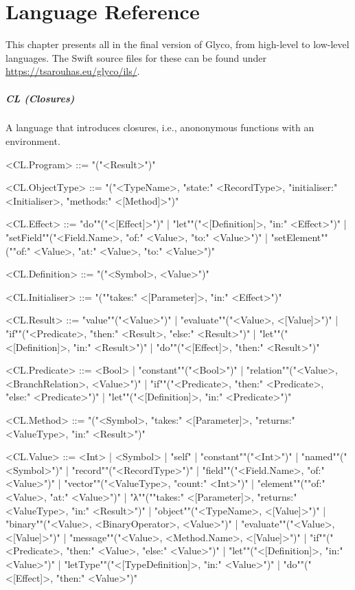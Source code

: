 \documentclass[main.tex]{subfiles}
\begin{document}
\onlyinsubfile{\mainmatter{}\appendix{}}

\chapter{Language Reference}
\label{ch:grammar}
This chapter presents all  in the final version of Glyco, from high-level to low-level languages. The Swift source files for these  can be found under \url{https://tsarouhas.eu/glyco/ils/}.

\paragraph{ CL (Closures) } A language that introduces closures, i.e., anononymous functions with an environment.
\begin{grammar}
	\footnotesize
				<CL.Program> ::=
							"("<Result>")"
				\par
				<CL.ObjectType> ::=
							"("<TypeName>, "state:" <RecordType>, "initialiser:" <Initialiser>, "methods:" <[Method]>")"
				\par
				<CL.Effect> ::=
						"do""("<[Effect]>")"
						| "let""("<[Definition]>, "in:" <Effect>")"
						| "setField""("<Field.Name>, "of:" <Value>, "to:" <Value>")"
						| "setElement""(""of:" <Value>, "at:" <Value>, "to:" <Value>")"
				\par
				<CL.Definition> ::=
							"("<Symbol>, <Value>")"
				\par
				<CL.Initialiser> ::=
							"(""takes:" <[Parameter]>, "in:" <Effect>")"
				\par
				<CL.Result> ::=
						"value""("<Value>")"
						| "evaluate""("<Value>, <[Value]>")"
						| "if""("<Predicate>, "then:" <Result>, "else:" <Result>")"
						| "let""("<[Definition]>, "in:" <Result>")"
						| "do""("<[Effect]>, "then:" <Result>")"
				\par
				<CL.Predicate> ::=
						<Bool> |
						"constant""("<Bool>")"
						| "relation""("<Value>, <BranchRelation>, <Value>")"
						| "if""("<Predicate>, "then:" <Predicate>, "else:" <Predicate>")"
						| "let""("<[Definition]>, "in:" <Predicate>")"
				\par
				<CL.Method> ::=
							"("<Symbol>, "takes:" <[Parameter]>, "returns:" <ValueType>, "in:" <Result>")"
				\par
				<CL.Value> ::=
						<Int> |
								<Symbol> |
						"self"
						| "constant""("<Int>")"
						| "named""("<Symbol>")"
						| "record""("<RecordType>")"
						| "field""("<Field.Name>, "of:" <Value>")"
						| "vector""("<ValueType>, "count:" <Int>")"
						| "element""(""of:" <Value>, "at:" <Value>")"
						| "λ""(""takes:" <[Parameter]>, "returns:" <ValueType>, "in:" <Result>")"
						| "object""("<TypeName>, <[Value]>")"
						| "binary""("<Value>, <BinaryOperator>, <Value>")"
						| "evaluate""("<Value>, <[Value]>")"
						| "message""("<Value>, <Method.Name>, <[Value]>")"
						| "if""("<Predicate>, "then:" <Value>, "else:" <Value>")"
						| "let""("<[Definition]>, "in:" <Value>")"
						| "letType""("<[TypeDefinition]>, "in:" <Value>")"
						| "do""("<[Effect]>, "then:" <Value>")"
				\par
\end{grammar}
\par
\end{document}
